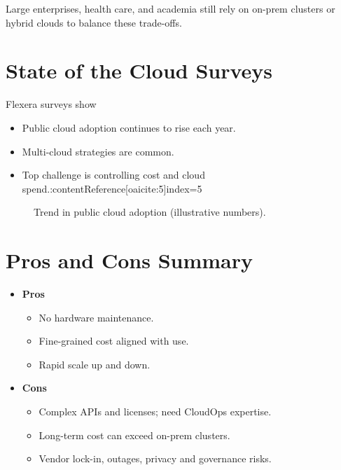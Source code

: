 \documentclass[11pt]{article}
\begin{document}
Large enterprises, health care, and academia still rely on on-prem clusters or hybrid clouds to balance these trade-offs.

\section{State of the Cloud Surveys}

Flexera surveys show

\begin{itemize}[itemsep=0pt]
  \item Public cloud adoption continues to rise each year.
  \item Multi-cloud strategies are common.
  \item Top challenge is controlling cost and cloud spend.:contentReference[oaicite:5]{index=5}
\end{itemize}

\begin{figure}[h]
  \centering
  \caption{Trend in public cloud adoption (illustrative numbers).}
\end{figure}

\section{Pros and Cons Summary}

\begin{itemize}[itemsep=0pt]
  \item \textbf{Pros}
    \begin{itemize}[itemsep=0pt]
      \item No hardware maintenance.
      \item Fine-grained cost aligned with use.
      \item Rapid scale up and down.
    \end{itemize}
  \item \textbf{Cons}
    \begin{itemize}[itemsep=0pt]
      \item Complex APIs and licenses; need CloudOps expertise.
      \item Long-term cost can exceed on-prem clusters.
      \item Vendor lock-in, outages, privacy and governance risks.
    \end{itemize}
\end{itemize}
\end{document}
